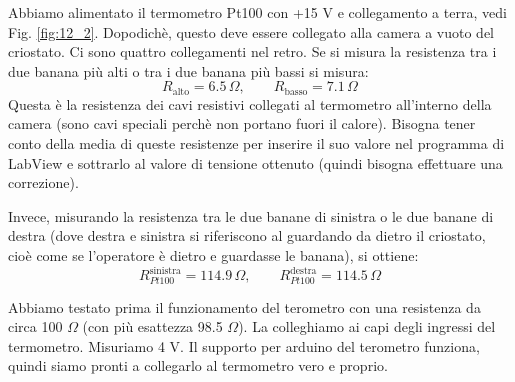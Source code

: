 \documentclass[../main/main.tex]{subfiles}
\begin{document}
Abbiamo alimentato il termometro Pt100 con +15 V e collegamento a terra, vedi Fig. \ref{fig:12_2}.
Dopodichè, questo deve essere collegato alla camera a vuoto del criostato. Ci sono quattro collegamenti nel retro.
Se si misura la resistenza tra i due banana più alti o tra i due banana più bassi si misura:
\begin{equation*}
  R_{\text{alto}} = 6.5 \, \Omega, \qquad  R_{\text{basso}} = 7.1 \, \Omega
\end{equation*}
Questa è la resistenza dei cavi resistivi collegati al termometro all'interno della camera (sono cavi speciali perchè non portano fuori il calore). Bisogna tener conto della media di queste resistenze per inserire il suo valore nel programma di LabView e sottrarlo al valore di tensione ottenuto (quindi bisogna effettuare una correzione).

Invece, misurando la resistenza tra le due banane di sinistra o le due banane di destra (dove destra e sinistra si riferiscono al guardando da dietro il criostato, cioè come se l'operatore è dietro e guardasse le banana), si ottiene:
\begin{equation*}
  R_{Pt100}^{\text{sinistra}} = 114.9 \, \Omega,  \qquad R_{Pt100}^{\text{destra}} = 114.5 \, \Omega
\end{equation*}

Abbiamo testato prima il funzionamento del terometro con una resistenza da circa 100 \( \Omega  \) (con più esattezza 98.5 \( \Omega  \)). La colleghiamo ai capi degli ingressi del termometro. Misuriamo 4 V. Il supporto per arduino del terometro funziona, quindi siamo pronti a collegarlo al termometro vero e proprio.
\end{document}
